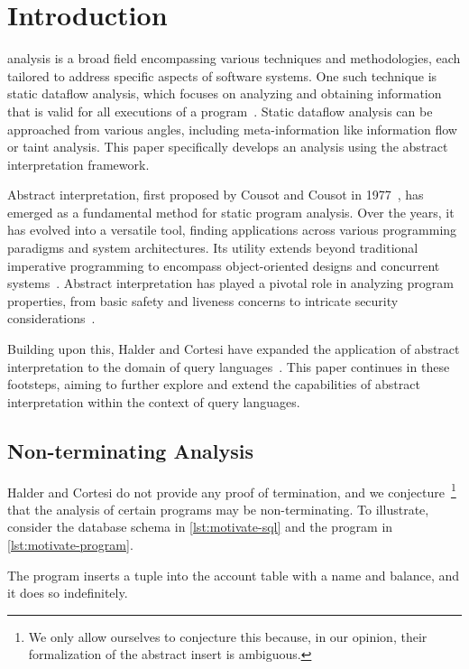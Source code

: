 \section{Introduction}\label{sec:introduction}
 analysis is a broad field encompassing various techniques and methodologies, each tailored to address specific aspects of software systems.
One such technique is static dataflow analysis, which focuses on analyzing and obtaining information that is valid for all executions of a program~\cite{moller_statitc_nodate, jackson_software_2000}.
Static dataflow analysis can be approached from various angles, including meta-information like information flow or taint analysis.
This paper specifically develops an analysis using the abstract interpretation framework.

Abstract interpretation, first proposed by Cousot and Cousot in 1977~\cite{cousot_abstract_1977}, has emerged as a fundamental method for static program analysis.
Over the years, it has evolved into a versatile tool, finding applications across various programming paradigms and system architectures.
Its utility extends beyond traditional imperative programming to encompass object-oriented designs and concurrent systems~\cite{gustafsson_analyzing_2013, mine_static_2023}.
Abstract interpretation has played a pivotal role in analyzing program properties, from basic safety and liveness concerns to intricate security considerations~\cite{mastroeni_abstract_2011}.

Building upon this, Halder and Cortesi have expanded the application of abstract interpretation to the domain of query languages~\cite{halder_abstract_2012}.
This paper continues in these footsteps, aiming to further explore and extend the capabilities of abstract interpretation within the context of query languages.

\subsection{Non-terminating Analysis}\label{subsec:non-terminating-analysis}
Halder and Cortesi do not provide any proof of termination, and we conjecture~\footnote{We only allow ourselves to conjecture this because, in our opinion, their formalization of the abstract insert is ambiguous.} that the analysis of certain programs may be non-terminating.
To illustrate, consider the database schema in \autoref{lst:motivate-sql} and the program in \autoref{lst:motivate-program}.

The program inserts a tuple into the account table with a name and balance, and it does so indefinitely.

